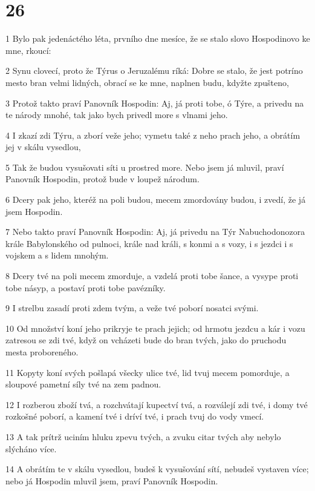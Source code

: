 \chapter{26}

\par 1 Bylo pak jedenáctého léta, prvního dne mesíce, že se stalo slovo Hospodinovo ke mne, rkoucí:
\par 2 Synu clovecí, proto že Týrus o Jeruzalému ríká: Dobre se stalo, že jest potríno mesto bran velmi lidných, obrací se ke mne, naplnen budu, kdyžte zpušteno,
\par 3 Protož takto praví Panovník Hospodin: Aj, já proti tobe, ó Týre, a privedu na te národy mnohé, tak jako bych privedl more s vlnami jeho.
\par 4 I zkazí zdi Týru, a zborí veže jeho; vymetu také z neho prach jeho, a obrátím jej v skálu vysedlou,
\par 5 Tak že budou vysušovati síti u prostred more. Nebo jsem já mluvil, praví Panovník Hospodin, protož bude v loupež národum.
\par 6 Dcery pak jeho, kteréž na poli budou, mecem zmordovány budou, i zvedí, že já jsem Hospodin.
\par 7 Nebo takto praví Panovník Hospodin: Aj, já privedu na Týr Nabuchodonozora krále Babylonského od pulnoci, krále nad králi, s konmi a s vozy, i s jezdci i s vojskem a s lidem mnohým.
\par 8 Dcery tvé na poli mecem zmorduje, a vzdelá proti tobe šance, a vysype proti tobe násyp, a postaví proti tobe pavézníky.
\par 9 I strelbu zasadí proti zdem tvým, a veže tvé poborí nosatci svými.
\par 10 Od množství koní jeho prikryje te prach jejich; od hrmotu jezdcu a kár i vozu zatresou se zdi tvé, když on vcházeti bude do bran tvých, jako do pruchodu mesta proboreného.
\par 11 Kopyty koní svých pošlapá všecky ulice tvé, lid tvuj mecem pomorduje, a sloupové pametní síly tvé na zem padnou.
\par 12 I rozberou zboží tvá, a rozchvátají kupectví tvá, a rozválejí zdi tvé, i domy tvé rozkošné poborí, a kamení tvé i dríví tvé, i prach tvuj do vody vmecí.
\par 13 A tak prítrž uciním hluku zpevu tvých, a zvuku citar tvých aby nebylo slýcháno více.
\par 14 A obrátím te v skálu vysedlou, budeš k vysušování sítí, nebudeš vystaven více; nebo já Hospodin mluvil jsem, praví Panovník Hospodin.
